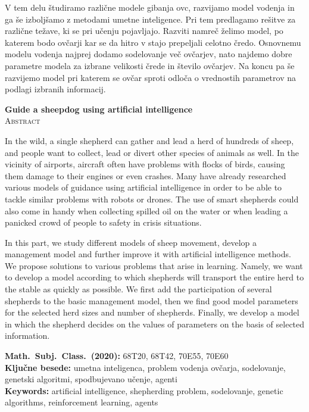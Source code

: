 \documentclass[12pt,a4paper,twoside]{article}
\newcommand{\kljucnebesede}{umetna inteligenca\sep problem vodenja ovčarja\sep sodelovanje\sep genetski algoritmi\sep spodbujevano učenje\sep agenti}
\newcommand{\keywords}{artificial intelligence\sep shepherding problem\sep sodelovanje\sep genetic algorithms\sep reinforcement learning\sep agents}
\newcommand{\sep}{, }
\theoremstyle{definition}
\theoremstyle{plain}
\numberwithin{equation}{section}
\begin{document}
V tem delu študiramo različne modele gibanja ovc, razvijamo model vodenja in ga še izboljšamo z metodami umetne inteligence. Pri tem predlagamo rešitve za različne težave, ki se pri učenju pojavljajo. Razviti namreč želimo model, po katerem bodo ovčarji kar se da hitro v stajo prepeljali celotno čredo. Osnovnemu modelu vodenja najprej dodamo sodelovanje več ovčarjev, nato najdemo dobre parametre modela za izbrane velikosti črede in število ovčarjev. Na koncu pa še razvijemo model pri katerem se ovčar sproti odloča o vrednostih parametrov na podlagi izbranih informacij.

\vfill
\begin{center}
\textbf{Guide a sheepdog using artificial intelligence} \\[3mm]
\textsc{Abstract}\\[2mm]
\end{center}

In the wild, a single shepherd can gather and lead a herd of hundreds of sheep, and people want to collect, lead or divert other species of animals as well. In the vicinity of airports, aircraft often have problems with flocks of birds, causing them damage to their engines or even crashes. Many have already researched various models of guidance using artificial intelligence in order to be able to tackle similar problems with robots or drones. The use of smart shepherds could also come in handy when collecting spilled oil on the water or when leading a panicked crowd of people to safety in crisis situations.

In this part, we study different models of sheep movement, develop a management model and further improve it with artificial intelligence methods. We propose solutions to various problems that arise in learning. Namely, we want to develop a model according to which shepherds will transport the entire herd to the stable as quickly as possible. We first add the participation of several shepherds to the basic management model, then we find good model parameters for the selected herd sizes and number of shepherds. Finally, we develop a model in which the shepherd decides on the values of parameters on the basis of selected information.

\vfill\noindent
\textbf{Math.~Subj.~Class.~(2020):} 68T20, 68T42, 70E55, 70E60 \\[1mm]
\textbf{Ključne besede:} \kljucnebesede \\[1mm]
\textbf{Keywords:} \keywords

\cleardoublepage
\setcounter{page}{1}
\setlength{\parskip}{0.8em}
\end{document}
